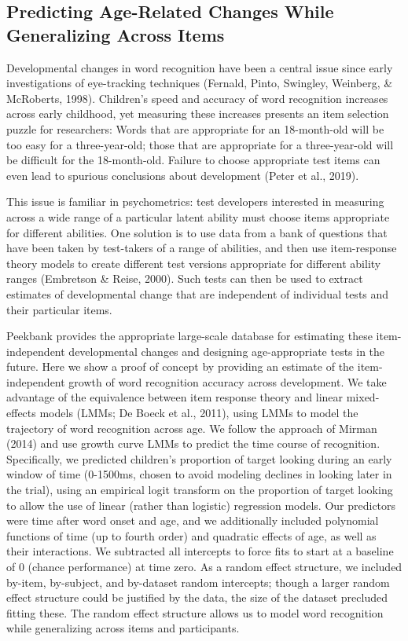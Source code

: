 \documentclass[10pt, letterpaper]{article}
\begin{document}
\hypertarget{predicting-age-related-changes-while-generalizing-across-items}{%
\subsection{Predicting Age-Related Changes While Generalizing Across
Items}\label{predicting-age-related-changes-while-generalizing-across-items}}

Developmental changes in word recognition have been a central issue
since early investigations of eye-tracking techniques (Fernald, Pinto,
Swingley, Weinberg, \& McRoberts, 1998). Children's speed and accuracy
of word recognition increases across early childhood, yet measuring
these increases presents an item selection puzzle for researchers: Words
that are appropriate for an 18-month-old will be too easy for a
three-year-old; those that are appropriate for a three-year-old will be
difficult for the 18-month-old. Failure to choose appropriate test items
can even lead to spurious conclusions about development (Peter et al.,
2019).

This issue is familiar in psychometrics: test developers interested in
measuring across a wide range of a particular latent ability must choose
items appropriate for different abilities. One solution is to use data
from a bank of questions that have been taken by test-takers of a range
of abilities, and then use item-response theory models to create
different test versions appropriate for different ability ranges
(Embretson \& Reise, 2000). Such tests can then be used to extract
estimates of developmental change that are independent of individual
tests and their particular items.

Peekbank provides the appropriate large-scale database for estimating
these item-independent developmental changes and designing
age-appropriate tests in the future. Here we show a proof of concept by
providing an estimate of the item-independent growth of word recognition
accuracy across development. We take advantage of the equivalence
between item response theory and linear mixed-effects models (LMMs; De
Boeck et al., 2011), using LMMs to model the trajectory of word
recognition across age. We follow the approach of Mirman (2014) and use
growth curve LMMs to predict the time course of recognition.
Specifically, we predicted children's proportion of target looking
during an early window of time (0-1500ms, chosen to avoid modeling
declines in looking later in the trial), using an empirical logit
transform on the proportion of target looking to allow the use of linear
(rather than logistic) regression models. Our predictors were time after
word onset and age, and we additionally included polynomial functions of
time (up to fourth order) and quadratic effects of age, as well as their
interactions. We subtracted all intercepts to force fits to start at a
baseline of 0 (chance performance) at time zero. As a random effect
structure, we included by-item, by-subject, and by-dataset random
intercepts; though a larger random effect structure could be justified
by the data, the size of the dataset precluded fitting these. The random
effect structure allows us to model word recognition while generalizing
across items and participants.
\end{document}
